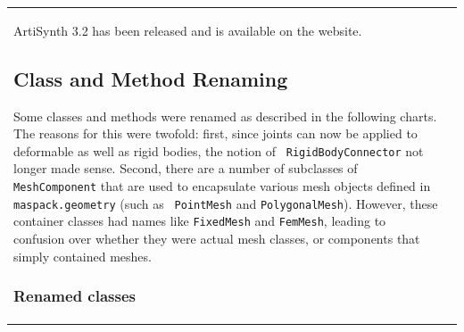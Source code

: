 \documentclass{article}
\begin{document}
\begin{tabular}{ll}
ArtiSynth 3.2 has been released and is available on the website.

\subsection*{Class and Method Renaming}

Some classes and methods were renamed as described in the following
charts. The reasons for this were twofold: first, since joints can now
be applied to deformable as well as rigid bodies, the notion of {\tt
RigidBodyConnector} not longer made sense. Second, there are a number
of subclasses of {\tt MeshComponent} that are used to encapsulate
various mesh objects defined in {\tt maspack.geometry} (such as {\tt
PointMesh} and {\tt PolygonalMesh}). However, these container classes
had names like {\tt FixedMesh} and {\tt FemMesh}, leading to confusion
over whether they were actual mesh classes, or components that simply
contained meshes.

\subsubsection*{Renamed classes}


\end{tabular}
\end{document}
